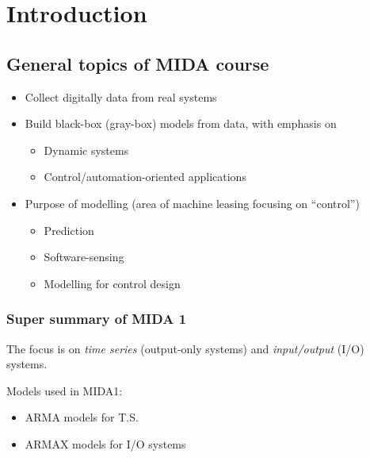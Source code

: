 \setcounter{chapter}{-1}
\chapter{Introduction}

\section{General topics of MIDA course}

\begin{itemize}
    \item Collect digitally data from real systems
    \item Build black-box (gray-box) models from data, with emphasis on
    \begin{itemize}
        \item Dynamic systems
        \item Control/automation-oriented applications
    \end{itemize}
    \item Purpose of modelling (area of machine leasing focusing on ``control'')
    \begin{itemize}
        \item Prediction
        \item Software-sensing
        \item Modelling for control design
    \end{itemize}
\end{itemize}

\subsection{Super summary of MIDA 1}
The focus is on \emph{time series} (output-only systems) and \emph{input/output} (I/O) systems.

Models used in MIDA1:
\begin{itemize}
    \item ARMA models for T.S.
    \item ARMAX models for I/O systems
\end{itemize}

